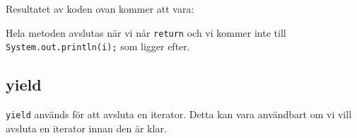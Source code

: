 \hypertarget{cb5}{}
\begin{Shaded}
\begin{Highlighting}[]
   \OperatorTok{(}\OperatorTok{[]}\OperatorTok{)} \OperatorTok{\{}
    \OperatorTok{=} \OperatorTok{;}
    \OperatorTok{(}\OperatorTok{=} \OperatorTok{;}\OperatorTok{\textless{}} \OperatorTok{;}\OperatorTok{++)} \OperatorTok{\{}
        \OperatorTok{(}\OperatorTok{\textgreater{}=}\OperatorTok{)} \OperatorTok{\{}
            \OperatorTok{;}
        \OperatorTok{\}}
        \OperatorTok{(}\OperatorTok{);}
    \OperatorTok{\}}
\OperatorTok{\}}
\end{Highlighting}
\end{Shaded}

Resultatet av koden ovan kommer att vara:

\begin{Shaded}
\begin{Highlighting}[]
\end{Highlighting}
\end{Shaded}

Hela metoden avslutas när vi når \texttt{return} och vi kommer inte till
\texttt{System.out.println(i);} som ligger efter.

\hypertarget{yield}{%
\subsection{yield}\label{yield}}

\texttt{yield} används för att avsluta en iterator. Detta kan vara
användbart om vi vill avsluta en iterator innan den är klar.

\hypertarget{cb7}{}
\begin{Shaded}
\begin{Highlighting}[]
   \OperatorTok{(}\OperatorTok{[]}\OperatorTok{)} \OperatorTok{\{}
    \OperatorTok{=} \OperatorTok{;}
    \OperatorTok{(}\OperatorTok{=} \OperatorTok{;}\OperatorTok{\textless{}} \OperatorTok{;}\OperatorTok{++)} \OperatorTok{\{}
        \OperatorTok{(}\OperatorTok{\textgreater{}=}\OperatorTok{)} \OperatorTok{\{}
\OperatorTok{;}
        \OperatorTok{\}}
        \OperatorTok{(}\OperatorTok{);}
    \OperatorTok{\}}
\OperatorTok{\}}
\end{Highlighting}
\end{Shaded}

